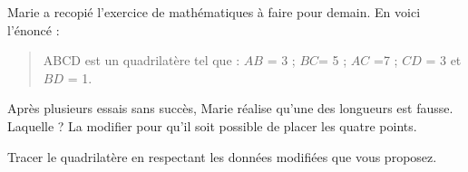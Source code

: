 
\begin{exercice}\label{exosmath-0771}

Marie a recopié l'exercice de mathématiques à faire pour demain. En voici l'énoncé :
\begin{quote}
    ABCD est un quadrilatère tel que : $AB$ = \unit{3}{\centi\meter} ; $BC $= \unit{5}{\centi\meter} ; $AC$ =\unit{7}{\centi\meter} ; $CD$ = \unit{3}{\centi\meter} et $BD$ = \unit{1}{\centi\meter}. 
\end{quote}
Après plusieurs essais sans succès, Marie réalise qu'une des longueurs est fausse.  Laquelle ? La modifier pour qu'il soit possible de placer les quatre points.

Tracer le quadrilatère en respectant les données modifiées que vous proposez.

\end{exercice}
